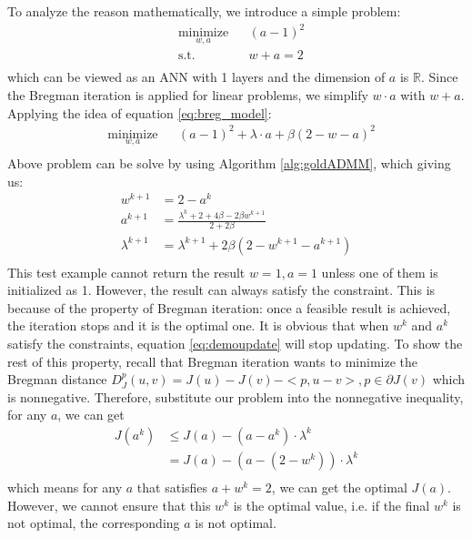 \documentclass[letterpaper, 10 pt, conference]{ieeeconf}  %
\begin{document}
To analyze the reason mathematically, we introduce a simple problem:
\begin{equation}
\begin{aligned}
& \underset{w,a}{\text{minimize}}  & & (a-1)^2 \\
& \text{s.t.} & & w+a =2\\
\end{aligned}
\label{eq:demo}
\end{equation}
which can be viewed as an ANN with 1 layers and the dimension of $a$ is $\mathbb{R}$. Since the Bregman iteration is applied for linear problems, we simplify $w \cdot a$ with $w + a$. Applying the idea of equation \eqref{eq:breg_model}:
\begin{equation}
\begin{aligned}
& \underset{w,a}{\text{minimize}}  & & (a-1)^2 + \lambda \cdot a + \beta (2-w-a)^2\\
\end{aligned}
\end{equation}
Above problem can be solve by using Algorithm \ref{alg:goldADMM}, which giving us:
\begin{equation}
\begin{aligned}
w^{k+1} &= 2-a^k \\
a^{k+1} &= \frac{\lambda^k+2+4\beta-2\beta w^{k+1}}{2+2\beta}\\
\lambda^{k+1} &= \lambda^{k+1} + 2\beta(2-w^{k+1}-a^{k+1})\\
\end{aligned}
\label{eq:demoupdate}
\end{equation}
This test example cannot return the result $w=1,a=1$ unless one of them is initialized as 1. However, the result can always satisfy the constraint. This is because of the property of Bregman iteration: once a feasible result is achieved, the iteration stops and it is the optimal one. It is obvious that when $w^k$ and $a^k$ satisfy the constraints, equation \eqref{eq:demoupdate} will stop updating. To show the rest of this property, recall that Bregman iteration wants to minimize the Bregman distance $D^p_J(u,v) = J(u)-J(v)-<p,u-v>, p \in \partial J(v)$ which is nonnegative. Therefore, substitute our problem into the nonnegative inequality, for any $a$, we can get
\begin{equation}
\begin{aligned}
J(a^k) & \leq J(a) -(a-a^k) \cdot \lambda^k \\
& = J(a) - (a-(2-w^k)) \cdot \lambda^k \\
\end{aligned}
\end{equation}
which means for any $a$ that satisfies $a+w^k=2$, we can get the optimal $J(a)$. However, we cannot ensure that this $w^k$ is the optimal value, i.e. if the final $w^k$ is not optimal, the corresponding $a$ is not optimal.
\end{document}
